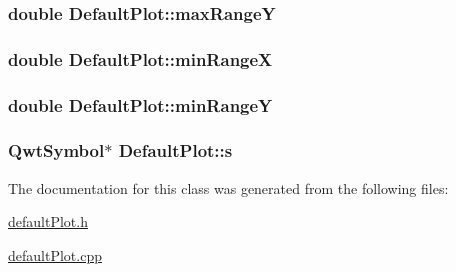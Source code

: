 \hypertarget{class_default_plot_a0a9fd99e0ffac64fbbe8e2c7d599699d}{
\subsubsection[{max\+Range\+Y}]{\setlength{\rightskip}{0pt plus 5cm}double Default\+Plot\+::max\+Range\+Y\hspace{0.3cm}{\ttfamily [protected]}}}\label{class_default_plot_a0a9fd99e0ffac64fbbe8e2c7d599699d}
\hypertarget{class_default_plot_a5fb55a0fc4fb764c9ab100ef8bed151a}{
\subsubsection[{min\+Range\+X}]{\setlength{\rightskip}{0pt plus 5cm}double Default\+Plot\+::min\+Range\+X\hspace{0.3cm}{\ttfamily [protected]}}}\label{class_default_plot_a5fb55a0fc4fb764c9ab100ef8bed151a}
\hypertarget{class_default_plot_a6430390e18d83bcd55212e7a56af7cb3}{
\subsubsection[{min\+Range\+Y}]{\setlength{\rightskip}{0pt plus 5cm}double Default\+Plot\+::min\+Range\+Y\hspace{0.3cm}{\ttfamily [protected]}}}\label{class_default_plot_a6430390e18d83bcd55212e7a56af7cb3}
\hypertarget{class_default_plot_a30118ba9670ca7bf1c852e98bf76771a}{
\subsubsection[{s}]{\setlength{\rightskip}{0pt plus 5cm}Qwt\+Symbol$\ast$ Default\+Plot\+::s}}\label{class_default_plot_a30118ba9670ca7bf1c852e98bf76771a}


The documentation for this class was generated from the following files\+:\begin{DoxyCompactItemize}
\item 
\hyperlink{default_plot_8h}{default\+Plot.\+h}\item 
\hyperlink{default_plot_8cpp}{default\+Plot.\+cpp}\end{DoxyCompactItemize}
